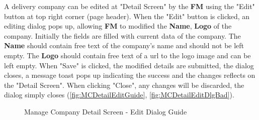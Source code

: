 A delivery company can be edited at "Detail Screen" by the \textbf{FM} using the "Edit" button at top right corner (page header). 
When the "Edit" button is clicked, an editing dialog pops up, allowing \textbf{FM} to modified the \textbf{Name}, \textbf{Logo} of the company. Initially the fields are filled with current data of the company. The \textbf{Name} should contain free text of the company's name and should not be left empty. The \textbf{Logo} should contain free text of a url to the logo image and can be left empty.
When "Save" is clicked, the modified details are submitted, the dialog closes, a message toast pops up indicating the success and the changes reflects on the "Detail Screen". When clicking "Close", any changes will be discarded, the dialog simply closes (\autoref{fig:MCDetailEditGuide}, \autoref{fig:MCDetailEditDlgBad}). 

\begin{figure}[H]
	\centering
    \vspace{5pt}
    \hspace{5pt}
    \caption{Manage Company Detail Screen - Edit Dialog Guide}
	\label{fig:MCDetailEditGuide}
\end{figure}


